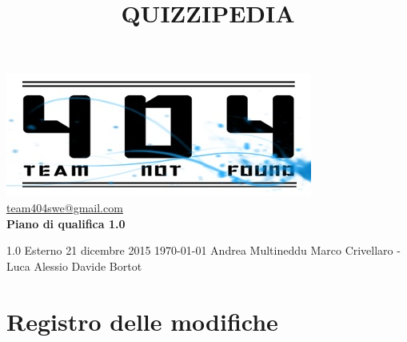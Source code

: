 \documentclass[a4paper,11pt]{article}
\title{\textbf{{\fontsize{8mm}{5mm}\selectfont QUIZZIPEDIA}}}
\date{}
\author{}
\begin{document}
	\maketitle
	\thispagestyle{empty}
	\begin{center}	
	\includegraphics{../../team_not_found}\\
	\fontsize{5mm}{3mm}\url{team404swe@gmail.com}\\
	
	\vspace{50mm}
	\textbf{Piano di qualifica 1.0}
	\end{center}
			{1.0} 							%
			{Esterno} 						%
			{21 dicembre 2015} 				%
			{\today} 						%
			{Andrea Multineddu}	%
			{Marco Crivellaro - Luca Alessio } 			%
			{Davide Bortot } 				%
	\newpage
	\thispagestyle{empty}
	\null  %

	\newpage
	\newpage
	\fancyfoot[R]{\thepage}
	
	\hspace{30 mm}
	\section*{Registro delle modifiche}
	
\end{document}
